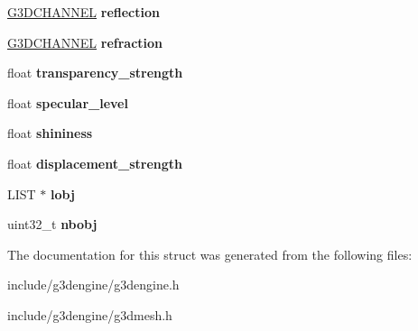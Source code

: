 \begin{DoxyCompactItemize}
\mbox{\label{struct__G3DMATERIAL_af3e69c3b727874b8f830b4be20211552}} 
\hyperlink{struct__G3DCHANNEL}{G3\+D\+C\+H\+A\+N\+N\+EL} {\bfseries reflection}
\item 
\mbox{\label{struct__G3DMATERIAL_acc9a867a3e364e8534eeba766ed2b057}} 
\hyperlink{struct__G3DCHANNEL}{G3\+D\+C\+H\+A\+N\+N\+EL} {\bfseries refraction}
\item 
\mbox{\label{struct__G3DMATERIAL_a9dedbbed4b0329fb98e3a5a62b719c61}} 
float {\bfseries transparency\+\_\+strength}
\item 
\mbox{\label{struct__G3DMATERIAL_a93c47fec03338bb04c150dde5a009774}} 
float {\bfseries specular\+\_\+level}
\item 
\mbox{\label{struct__G3DMATERIAL_afd24d643106281c1aadc3dc6dd66db7d}} 
float {\bfseries shininess}
\item 
\mbox{\label{struct__G3DMATERIAL_a62bbb17ebab87079c555e23b7997d7ff}} 
float {\bfseries displacement\+\_\+strength}
\item 
\mbox{\label{struct__G3DMATERIAL_a6404f46b9b28181ed846e9072bb729d8}} 
L\+I\+ST $\ast$ {\bfseries lobj}
\item 
\mbox{\label{struct__G3DMATERIAL_abbbf7d66580d8092133837a60c1fb222}} 
uint32\+\_\+t {\bfseries nbobj}
\end{DoxyCompactItemize}


The documentation for this struct was generated from the following files\+:\begin{DoxyCompactItemize}
\item 
include/g3dengine/g3dengine.\+h\item 
include/g3dengine/g3dmesh.\+h\end{DoxyCompactItemize}
